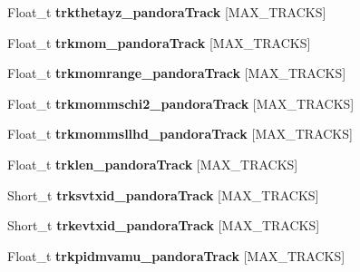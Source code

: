\begin{DoxyCompactItemize}
\item 
\hypertarget{classanatree_a3b69b754f03c24f4f95ff3588f4d1f16}{Float\-\_\-t {\bfseries trkthetayz\-\_\-pandora\-Track} \mbox{[}M\-A\-X\-\_\-\-T\-R\-A\-C\-K\-S\mbox{]}}\label{classanatree_a3b69b754f03c24f4f95ff3588f4d1f16}

\item 
\hypertarget{classanatree_a67a174c135adc7925291164837310d9a}{Float\-\_\-t {\bfseries trkmom\-\_\-pandora\-Track} \mbox{[}M\-A\-X\-\_\-\-T\-R\-A\-C\-K\-S\mbox{]}}\label{classanatree_a67a174c135adc7925291164837310d9a}

\item 
\hypertarget{classanatree_a0005c24e7a511ee7cb4db899cd4df8d5}{Float\-\_\-t {\bfseries trkmomrange\-\_\-pandora\-Track} \mbox{[}M\-A\-X\-\_\-\-T\-R\-A\-C\-K\-S\mbox{]}}\label{classanatree_a0005c24e7a511ee7cb4db899cd4df8d5}

\item 
\hypertarget{classanatree_a73ccb0435dd251dc6c0ef9f98cb516b2}{Float\-\_\-t {\bfseries trkmommschi2\-\_\-pandora\-Track} \mbox{[}M\-A\-X\-\_\-\-T\-R\-A\-C\-K\-S\mbox{]}}\label{classanatree_a73ccb0435dd251dc6c0ef9f98cb516b2}

\item 
\hypertarget{classanatree_a93bd3ed25f1c1f6db57d77edf391346c}{Float\-\_\-t {\bfseries trkmommsllhd\-\_\-pandora\-Track} \mbox{[}M\-A\-X\-\_\-\-T\-R\-A\-C\-K\-S\mbox{]}}\label{classanatree_a93bd3ed25f1c1f6db57d77edf391346c}

\item 
\hypertarget{classanatree_acd1961cb842d4578a53ec76be72ed606}{Float\-\_\-t {\bfseries trklen\-\_\-pandora\-Track} \mbox{[}M\-A\-X\-\_\-\-T\-R\-A\-C\-K\-S\mbox{]}}\label{classanatree_acd1961cb842d4578a53ec76be72ed606}

\item 
\hypertarget{classanatree_a54239e76d4ff42ad1881942c5984527d}{Short\-\_\-t {\bfseries trksvtxid\-\_\-pandora\-Track} \mbox{[}M\-A\-X\-\_\-\-T\-R\-A\-C\-K\-S\mbox{]}}\label{classanatree_a54239e76d4ff42ad1881942c5984527d}

\item 
\hypertarget{classanatree_af9d547ab61ed895f06eadddf3f5b1a48}{Short\-\_\-t {\bfseries trkevtxid\-\_\-pandora\-Track} \mbox{[}M\-A\-X\-\_\-\-T\-R\-A\-C\-K\-S\mbox{]}}\label{classanatree_af9d547ab61ed895f06eadddf3f5b1a48}

\item 
\hypertarget{classanatree_a162fe363578d752417ce4df642ca58ba}{Float\-\_\-t {\bfseries trkpidmvamu\-\_\-pandora\-Track} \mbox{[}M\-A\-X\-\_\-\-T\-R\-A\-C\-K\-S\mbox{]}}\label{classanatree_a162fe363578d752417ce4df642ca58ba}


\end{DoxyCompactItemize}
